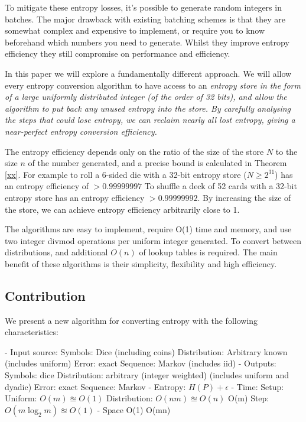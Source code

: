 \documentclass[12pt]{article}
\begin{document}
To mitigate these entropy losses, it's possible to generate random integers in batches. The major drawback with existing batching schemes is that they are somewhat complex and expensive to implement, or require you to know beforehand which numbers you need to generate. Whilst they improve entropy efficiency they still compromise on performance and efficiency.

In this paper we will explore a fundamentally different approach. We will allow every entropy conversion algorithm to have access to an \em entropy store \em in the form of a large uniformly distributed integer (of the order of 32 bits), and allow the algorithm to put back any unused entropy into the store. By carefully analysing the steps that could lose entropy, we can reclaim nearly all lost entropy, giving a near-perfect entropy conversion efficiency. 

The entropy efficiency depends only on the ratio of the size of the store $N$ to the size $n$ of the number generated, and a precise bound is calculated in Theorem \ref{xx}. For example to roll a 6-sided die with a 32-bit entropy store ($N\ge2^{31}$) has an entropy efficiency of $>0.99999997$ To shuffle a deck of 52 cards with a 32-bit entropy store has an entropy efficiency $>0.99999992$. By increasing the size of the store, we can achieve entropy efficiency arbitrarily close to 1.

The algorithms are easy to implement, require O(1) time and memory, and use two integer divmod operations per uniform integer generated. To convert between distributions, and additional $O(n)$ of lookup tables is required. The main benefit of these algorithms is their simplicity, flexibility and high efficiency.

\subsection {Contribution}

We present a new algorithm for converting entropy with the following characteristics:

- Input source: 
    Symbols: Dice (including coins)
    Distribution: Arbitrary known (includes uniform)
    Error: exact
    Sequence: Markov (includes iid)
- Outputs:
    Symbols: dice
    Distribution: arbitrary (integer weighted) (includes uniform and dyadic)
    Error: exact
    Sequence: Markov
- Entropy: $H(P) + \epsilon$
- Time:
    Setup:
        Uniform: $O(m) \approxeq O(1)$
        Distribution: $O(nm) \approxeq O(n)$
        O(m)
    Step:
        $O(m\log_2m) \approxeq O(1)$
- Space 
    O(1)
    O(mn) 
\end{document}
